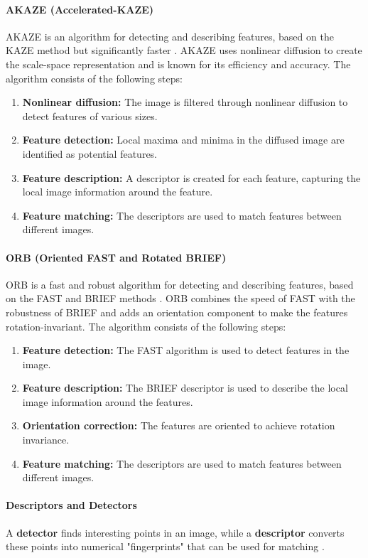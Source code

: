 \documentclass[conference, a4paper]{IEEEtran}
\begin{document}
\paragraph{AKAZE (Accelerated-KAZE)}
AKAZE is an algorithm for detecting and describing features, based on the KAZE method but significantly faster \cite{opencv_akaze}. AKAZE uses nonlinear diffusion to create the scale-space representation and is known for its efficiency and accuracy. The algorithm consists of the following steps:
\begin{enumerate}
	\item \textbf{Nonlinear diffusion:} The image is filtered through nonlinear diffusion to detect features of various sizes.
	\item \textbf{Feature detection:} Local maxima and minima in the diffused image are identified as potential features.
	\item \textbf{Feature description:} A descriptor is created for each feature, capturing the local image information around the feature.
	\item \textbf{Feature matching:} The descriptors are used to match features between different images.
\end{enumerate}

\paragraph{ORB (Oriented FAST and Rotated BRIEF)}
ORB is a fast and robust algorithm for detecting and describing features, based on the FAST and BRIEF methods \cite{orb}. ORB combines the speed of FAST with the robustness of BRIEF and adds an orientation component to make the features rotation-invariant. The algorithm consists of the following steps:
\begin{enumerate}
	\item \textbf{Feature detection:} The FAST algorithm is used to detect features in the image.
	\item \textbf{Feature description:} The BRIEF descriptor is used to describe the local image information around the features.
	\item \textbf{Orientation correction:} The features are oriented to achieve rotation invariance.
	\item \textbf{Feature matching:} The descriptors are used to match features between different images.
\end{enumerate}

\paragraph{Descriptors and Detectors}
A \textbf{detector} finds interesting points in an image, while a \textbf{descriptor} converts these points into numerical "fingerprints" that can be used for matching \cite{opencv_features}.
\end{document}
